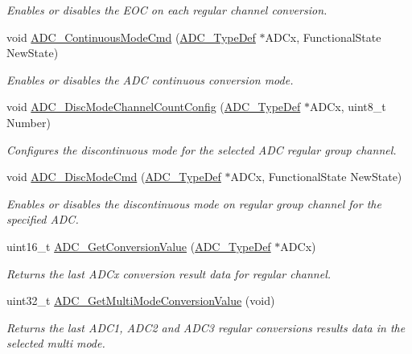 \begin{DoxyCompactItemize}
\begin{DoxyCompactList}\small\item\em Enables or disables the E\+OC on each regular channel conversion. \end{DoxyCompactList}\item 
void \hyperlink{group___a_d_c___group4_ga879d70e9345d35688590938503f961db}{A\+D\+C\+\_\+\+Continuous\+Mode\+Cmd} (\hyperlink{struct_a_d_c___type_def}{A\+D\+C\+\_\+\+Type\+Def} $\ast$A\+D\+Cx, Functional\+State New\+State)
\begin{DoxyCompactList}\small\item\em Enables or disables the A\+DC continuous conversion mode. \end{DoxyCompactList}\item 
void \hyperlink{group___a_d_c___group4_ga6eb241ba82d67d1371136c9132083937}{A\+D\+C\+\_\+\+Disc\+Mode\+Channel\+Count\+Config} (\hyperlink{struct_a_d_c___type_def}{A\+D\+C\+\_\+\+Type\+Def} $\ast$A\+D\+Cx, uint8\+\_\+t Number)
\begin{DoxyCompactList}\small\item\em Configures the discontinuous mode for the selected A\+DC regular group channel. \end{DoxyCompactList}\item 
void \hyperlink{group___a_d_c___group4_ga1909649d10253ce88d986ffbb94a4be6}{A\+D\+C\+\_\+\+Disc\+Mode\+Cmd} (\hyperlink{struct_a_d_c___type_def}{A\+D\+C\+\_\+\+Type\+Def} $\ast$A\+D\+Cx, Functional\+State New\+State)
\begin{DoxyCompactList}\small\item\em Enables or disables the discontinuous mode on regular group channel for the specified A\+DC. \end{DoxyCompactList}\item 
uint16\+\_\+t \hyperlink{group___a_d_c___group4_gaaf74221c285ec5dab5e66baf7bec6bd3}{A\+D\+C\+\_\+\+Get\+Conversion\+Value} (\hyperlink{struct_a_d_c___type_def}{A\+D\+C\+\_\+\+Type\+Def} $\ast$A\+D\+Cx)
\begin{DoxyCompactList}\small\item\em Returns the last A\+D\+Cx conversion result data for regular channel. \end{DoxyCompactList}\item 
uint32\+\_\+t \hyperlink{group___a_d_c___group4_ga989f4365b56be99999b8ec096aba2081}{A\+D\+C\+\_\+\+Get\+Multi\+Mode\+Conversion\+Value} (void)
\begin{DoxyCompactList}\small\item\em Returns the last A\+D\+C1, A\+D\+C2 and A\+D\+C3 regular conversions results data in the selected multi mode. \end{DoxyCompactList}\end{DoxyCompactItemize}


